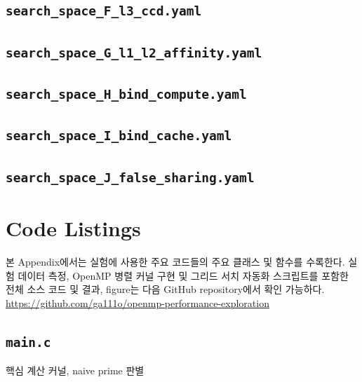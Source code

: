 \documentclass[11pt,a4paper]{article}
\begin{document}
\subsection{\texttt{search\_space\_F\_l3\_ccd.yaml}}


\subsection{\texttt{search\_space\_G\_l1\_l2\_affinity.yaml}}


\subsection{\texttt{search\_space\_H\_bind\_compute.yaml}}


\subsection{\texttt{search\_space\_I\_bind\_cache.yaml}}


\subsection{\texttt{search\_space\_J\_false\_sharing.yaml}}


\section{Code Listings}
\label{app:code}

본 Appendix에서는 실험에 사용한 주요 코드들의 주요 클래스 및 함수를 수록한다. 실험 데이터 측정, OpenMP 병렬 커널 구현 및 그리드 서치 자동화 스크립트를 포함한 전체 소스 코드 및 결과, figure는 다음 GitHub repository에서 확인 가능하다. \url{https://github.com/ga111o/openmp-performance-exploration}

\subsection{\texttt{main.c}}
\label{app:code-main}
핵심 계산 커널, naive prime 판별

\end{document}
